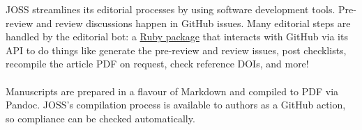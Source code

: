 \documentclass[25pt, a0paper, portrait]{tikzposter}
\begin{document}
\begin{columns}

{JOSS streamlines its editorial processes by using software
  development tools.  Pre-review and review discussions happen in
  GitHub issues.  Many editorial steps are handled by the editorial
  bot: a \href{https://buffy.readthedocs.io/}{Ruby package}
  that interacts with GitHub via its API to do things
  like generate the pre-review and review issues, post checklists,
  recompile the article PDF on request, check reference DOIs, and more! \\
  \\
  Manuscripts are prepared in a flavour of Markdown and compiled to
  PDF via Pandoc.  JOSS's compilation process is available to authors
  as a GitHub action, so compliance can be checked automatically.
}



\end{columns}
\end{document}
